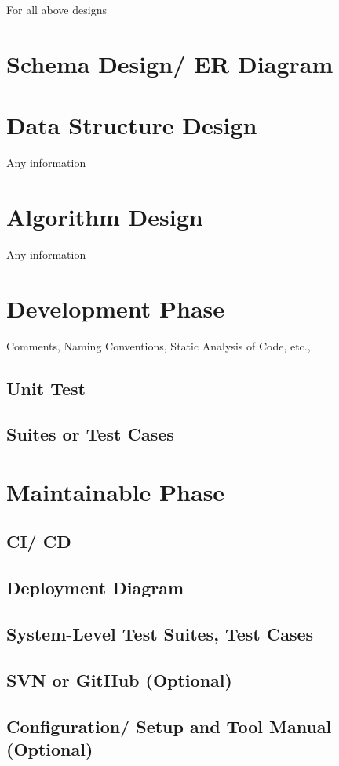 For all above designs

\section{Schema Design/ ER Diagram}
\section{Data Structure Design}
Any information
\section{Algorithm Design}
Any information
\section{Development Phase}
Comments, Naming Conventions, Static Analysis of Code, etc.,
\subsection{Unit Test}
\subsection{Suites or Test Cases}
\section{Maintainable Phase}
\subsection{CI/ CD}
\subsection{Deployment Diagram}
\subsection{System-Level Test Suites, Test      Cases}
\subsection{SVN or GitHub (Optional)}
\subsection{Configuration/ Setup and Tool Manual (Optional)}



